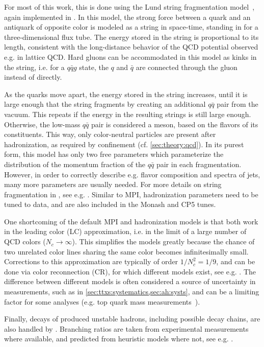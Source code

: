 For most of this work, this is done using the Lund string fragmentation model~\cite{Andersson:1983ia,Sjostrand:1984ic}, again implemented in \pythia. In this model, the strong force between a quark and an antiquark of opposite color is modeled as a string in space-time, standing in for a three-dimensional flux tube. The energy stored in the string is proportional to its length, consistent with the long-distance behavior of the QCD potential observed e.g. in lattice QCD. Hard gluons can be accommodated in this model as kinks in the string, i.e. for a $q\bar{q}g$ state, the $q$ and $\bar{q}$ are connected through the gluon instead of directly.

As the quarks move apart, the energy stored in the string increases, until it is large enough that the string fragments by creating an additional $q\bar{q}$ pair from the vacuum. This repeats if the energy in the resulting strings is still large enough. Otherwise, the low-mass $q\bar{q}$ pair is considered a meson, based on the flavors of its constituents. This way, only color-neutral particles are present after hadronization, as required by confinement (cf. \cref{sec:theory:qcd}). In its purest form, this model has only two free parameters which parameterize the distribution of the momentum fraction of the $q\bar{q}$ pair in each fragmentation. However, in order to correctly describe e.g. flavor composition and \pt spectra of jets, many more parameters are usually needed. For more details on string fragmentation in \pythia, see e.g. . Similar to MPI, hadronization parameters need to be tuned to data, and are also included in the Monash and CP5 tunes.

One shortcoming of the default MPI and hadronization models is that both work in the leading color (LC) approximation, i.e. in the limit of a large number of QCD colors ($N_c \rightarrow \infty$). This simplifies the models greatly because the chance of two unrelated color lines sharing the same color becomes infinitesimally small. Corrections to this approximation are typically of order $1/N_c^2 = 1/9$, and can be done via color reconnection (CR), for which different models exist, see e.g. . The difference between different models is often considered a source of uncertainty in measurements, such as in \cref{sec:ttxs:systematics,sec:ah:systs}, and can be a limiting factor for some analyses (e.g. top quark mass measurements~\cite{CMS:TOP-20-008,ATLAS:2025bpp}).

Finally, decays of produced unstable hadrons, including possible decay chains, are also handled by \pythia. Branching ratios are taken from experimental measurements where available, and predicted from heuristic models where not, see e.g. .


